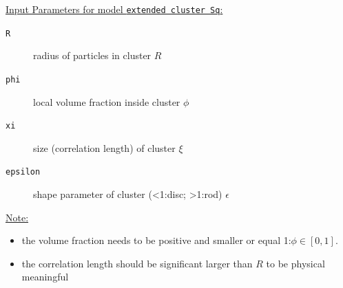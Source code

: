 \noindent \uline{Input Parameters for model \texttt{extended cluster Sq}:}
\begin{description}
\item[\texttt{R}] radius of particles in cluster $R$
\item[\texttt{phi}] local volume fraction inside cluster $\phi$
\item[\texttt{xi}] size (correlation length) of cluster $\xi$
\item[\texttt{epsilon}] shape parameter of cluster (<1:disc; >1:rod) $\epsilon$
\end{description}


\noindent\uline{Note:}
\begin{itemize}
\item the volume fraction needs to be positive and smaller or equal 1:$\phi\in [0,1]$.
\item the correlation length should be significant larger than $R$ to be physical meaningful
\end{itemize} 